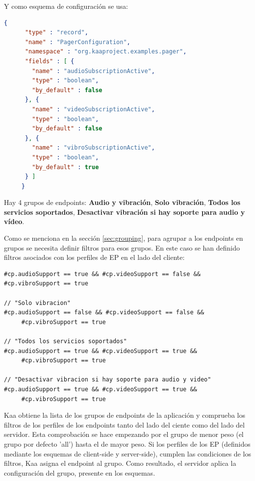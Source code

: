 \documentclass[12pt, twoside]{book}
\begin{document}
Y como esquema de configuración se usa:
\begin{lstlisting}[language=json]
     {
	  "type" : "record",
	  "name" : "PagerConfiguration",
	  "namespace" : "org.kaaproject.examples.pager",
	  "fields" : [ {
		"name" : "audioSubscriptionActive",
		"type" : "boolean",
		"by_default" : false
	  }, {
		"name" : "videoSubscriptionActive",
		"type" : "boolean",
		"by_default" : false
	  }, {
		"name" : "vibroSubscriptionActive",
		"type" : "boolean",
		"by_default" : true
	  } ]
     }
\end{lstlisting}

Hay 4 grupos de endpoints: \textbf{Audio y vibración}, \textbf{Solo vibración}, \textbf{Todos los servicios soportados}, \textbf{Desactivar vibración si hay soporte para audio y vídeo}. 

Como se menciona en la sección \ref{sec:grouping}, para agrupar a los endpoints en grupos se necesita definir filtros para esos grupos. En este caso se han definido filtros asociados con los perfiles de EP en el lado del cliente: 
\begin{lstlisting}[frame=shadowbox,basicstyle=\footnotesize , breaklines=true]
% Filtros para el grupo de "Audio y Vibracion"
#cp.audioSupport == true && #cp.videoSupport == false && #cp.vibroSupport == true
		
// "Solo vibracion"
#cp.audioSupport == false && #cp.videoSupport == false &&
     #cp.vibroSupport == true
		
// "Todos los servicios soportados"
#cp.audioSupport == true && #cp.videoSupport == true && 
     #cp.vibroSupport == true
		
// "Desactivar vibracion si hay soporte para audio y video"
#cp.audioSupport == true && #cp.videoSupport == true && 
     #cp.vibroSupport == true
\end{lstlisting}
Kaa obtiene la lista de los grupos de endpoints de la aplicación y comprueba los filtros de los perfiles de los endpoints tanto del lado del ciente como del lado del servidor. Esta comprobación se hace empezando por el grupo de menor peso (el grupo por defecto 'all') hasta el de mayor peso. Si los perfiles de los EP (definidos mediante los esquemas de client-side y server-side), cumplen las condiciones de los filtros, Kaa asigna el endpoint al grupo. Como resultado, el servidor aplica la configuración del grupo, presente en los esquemas. \\
\end{document}
